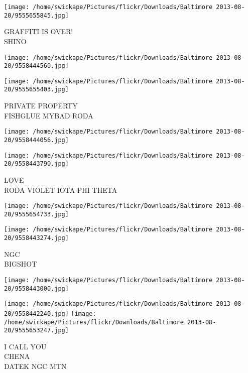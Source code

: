\documentclass[10pt,letterpaper]{article}
\begin{document}
\vspace{0.25in}
\texttt{[image: /home/swickape/Pictures/flickr/Downloads/Baltimore 2013-08-20/9555655845.jpg]}

GRAFFITI IS OVER!\\
SHINO\\
\pagebreak

\texttt{[image: /home/swickape/Pictures/flickr/Downloads/Baltimore 2013-08-20/9558444560.jpg]}

\vspace{0.25in}
\texttt{[image: /home/swickape/Pictures/flickr/Downloads/Baltimore 2013-08-20/9555655403.jpg]}

PRIVATE PROPERTY\\
FISHGLUE MYBAD RODA\\
\pagebreak

\texttt{[image: /home/swickape/Pictures/flickr/Downloads/Baltimore 2013-08-20/9558444056.jpg]}

\vspace{0.25in}
\texttt{[image: /home/swickape/Pictures/flickr/Downloads/Baltimore 2013-08-20/9558443790.jpg]}

LOVE\\
RODA VIOLET IOTA PHI THETA\\
\pagebreak

\texttt{[image: /home/swickape/Pictures/flickr/Downloads/Baltimore 2013-08-20/9555654733.jpg]}

\vspace{0.25in}
\texttt{[image: /home/swickape/Pictures/flickr/Downloads/Baltimore 2013-08-20/9558443274.jpg]}

NGC\\
BIGSHOT\\
\pagebreak

\texttt{[image: /home/swickape/Pictures/flickr/Downloads/Baltimore 2013-08-20/9558443000.jpg]}

\vspace{0.25in}
\texttt{[image: /home/swickape/Pictures/flickr/Downloads/Baltimore 2013-08-20/9558442240.jpg]}
\texttt{[image: /home/swickape/Pictures/flickr/Downloads/Baltimore 2013-08-20/9555653247.jpg]}

I CALL YOU\\
CHENA\\
DATEK NGC MTN\\
\pagebreak
\end{document}
